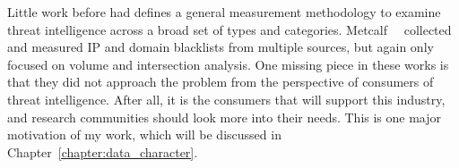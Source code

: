 Little work before had defines a general measurement methodology to
examine threat intelligence across a broad set of types and categories.
Metcalf~\etal~\cite{metcalf2015blacklist} collected and measured IP
and domain blacklists from multiple sources, but again only focused 
on volume and intersection analysis. One missing piece in these works
is that they did not approach the problem from the perspective of 
consumers of threat intelligence.  After all, it is the consumers that
will support this industry, and research communities should look more
into their needs. This is one major motivation of my work, which will
be discussed in Chapter~\ref{chapter:data_character}.